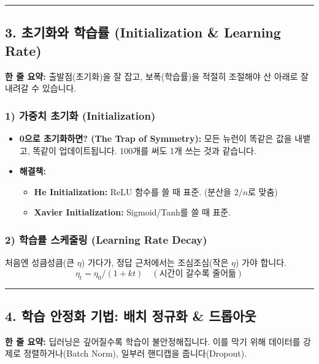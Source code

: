 \documentclass[11pt,a4paper]{book}
\theoremstyle{definition}
\begin{document}
\vspace{0.5cm}\hrule\vspace{0.5cm}

\subsection{3. 초기화와 학습률 (Initialization \& Learning Rate)}

\begin{conceptbox}[title={개념 3: 시작이 반이다}]
\textbf{한 줄 요약:} 출발점(초기화)을 잘 잡고, 보폭(학습률)을 적절히 조절해야 산 아래로 잘 내려갈 수 있습니다.
\end{conceptbox}

\subsubsection*{1) 가중치 초기화 (Initialization)}
\begin{itemize}
    \item \textbf{0으로 초기화하면? (The Trap of Symmetry):} 모든 뉴런이 똑같은 값을 내뱉고, 똑같이 업데이트됩니다. 100개를 써도 1개 쓰는 것과 같습니다.
    \item \textbf{해결책:}
    \begin{itemize}
        \item \textbf{He Initialization:} ReLU 함수를 쓸 때 표준. (분산을 $2/n$로 맞춤)
        \item \textbf{Xavier Initialization:} Sigmoid/Tanh를 쓸 때 표준.
    \end{itemize}
\end{itemize}

\subsubsection*{2) 학습률 스케줄링 (Learning Rate Decay)}
처음엔 성큼성큼(큰 $\eta$) 가다가, 정답 근처에서는 조심조심(작은 $\eta$) 가야 합니다.
$$ \eta_t = \eta_0 / (1 + kt) \quad (\text{시간이 갈수록 줄어듦}) $$

\vspace{0.5cm}\hrule\vspace{0.5cm}

\subsection{4. 학습 안정화 기법: 배치 정규화 \& 드롭아웃}

\begin{conceptbox}[title={개념 4: 흔들리지 않는 편안함}]
\textbf{한 줄 요약:} 딥러닝은 깊어질수록 학습이 불안정해집니다. 이를 막기 위해 데이터를 강제로 정렬하거나(Batch Norm), 일부러 핸디캡을 줍니다(Dropout).
\end{conceptbox}
\end{document}
